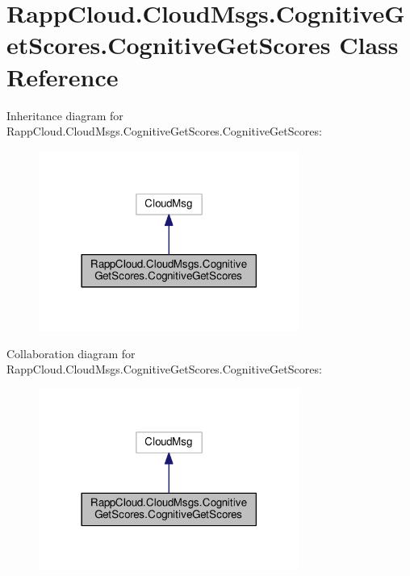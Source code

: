 \hypertarget{classRappCloud_1_1CloudMsgs_1_1CognitiveGetScores_1_1CognitiveGetScores}{\section{Rapp\-Cloud.\-Cloud\-Msgs.\-Cognitive\-Get\-Scores.\-Cognitive\-Get\-Scores Class Reference}
\label{classRappCloud_1_1CloudMsgs_1_1CognitiveGetScores_1_1CognitiveGetScores}
}


Inheritance diagram for Rapp\-Cloud.\-Cloud\-Msgs.\-Cognitive\-Get\-Scores.\-Cognitive\-Get\-Scores\-:
\nopagebreak
\begin{figure}[H]
\begin{center}
\leavevmode
\includegraphics[width=242pt]{classRappCloud_1_1CloudMsgs_1_1CognitiveGetScores_1_1CognitiveGetScores__inherit__graph}
\end{center}
\end{figure}


Collaboration diagram for Rapp\-Cloud.\-Cloud\-Msgs.\-Cognitive\-Get\-Scores.\-Cognitive\-Get\-Scores\-:
\nopagebreak
\begin{figure}[H]
\begin{center}
\leavevmode
\includegraphics[width=242pt]{classRappCloud_1_1CloudMsgs_1_1CognitiveGetScores_1_1CognitiveGetScores__coll__graph}
\end{center}
\end{figure}
